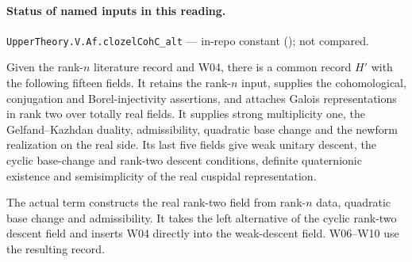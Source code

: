 

\paragraph{Status of named inputs in this reading.}
\noindent\nolinkurl{UpperTheory.V.Af.clozelCohC_alt} --- in-repo constant (); not compared.\par

\begin{formalstatement}\label{sub:W03}
Given the rank-$n$ literature record and W04, there is a common
record $H'$ with the following fifteen fields. It retains the rank-$n$
input, supplies the cohomological, conjugation and Borel-injectivity
assertions, and attaches Galois representations in rank two over totally
real fields. It supplies strong multiplicity one, the Gelfand--Kazhdan
duality, admissibility, quadratic base change and the newform
realization on the real side. Its last five fields give weak unitary
descent, the cyclic base-change and rank-two descent conditions,
definite quaternionic existence and semisimplicity of the real cuspidal
representation.
\end{formalstatement}
The actual term constructs the real rank-two field from rank-$n$ data,
quadratic base change and admissibility. It takes the left alternative
of the cyclic rank-two descent field and inserts W04 directly into the
weak-descent field. W06--W10 use the resulting record.
